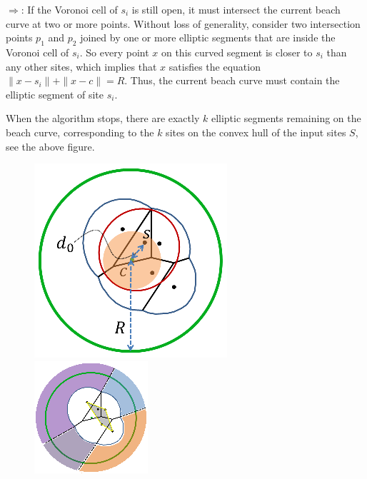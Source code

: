 {{$\Rightarrow$: If the Voronoi cell of $s_i$ is still open, it must
intersect the current beach curve at two or more points. Without
loss of generality, consider two intersection points $p_1$ and $p_2$
joined by one or more elliptic segments that are inside the Voronoi cell of $s_i$.
So every point $x$ on this curved segment is closer to
$s_i$ than any other sites, which implies that $x$ satisfies
the equation $\|x-s_i\|+\|x-c\|=R$. Thus, the current beach curve must
contain the elliptic segment of site $s_i$. %

When the algorithm stops, there are exactly $k$ elliptic segments
remaining on the beach curve, corresponding to the $k$ sites on the
convex hull of the input sites $S$, see the above figure.
\begin{figure}[!h]
\begin{center}
\includegraphics[width=0.49\columnwidth]{figs/sweepcircle/coverDomain.PNG}
\includegraphics[width=0.49\columnwidth]{figs/sweepcircle/convex.PNG}

\end{center}
\end{figure}}}
